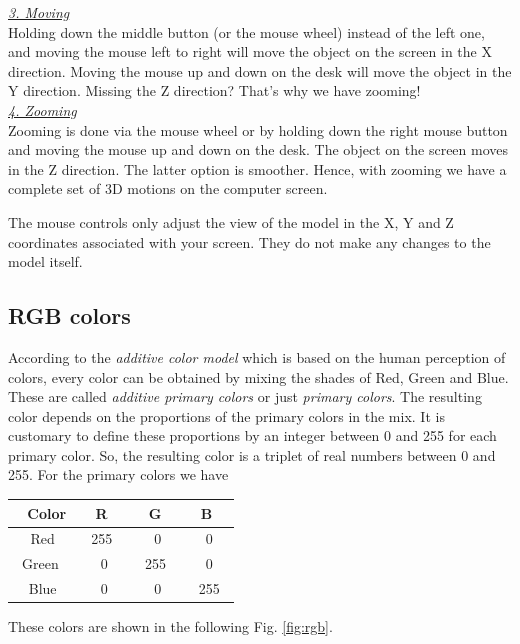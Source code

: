 \noindent
\underline{\em 3. Moving}\\

\noindent
Holding down the middle button (or the mouse wheel) instead of the 
left one, and moving the mouse left to right will move the object on the 
screen in the X direction. Moving the mouse up and down on the desk will 
move the object in the Y direction. Missing the Z direction? That's why 
we have zooming!\\

\noindent
\underline{\em 4. Zooming}\\

\noindent
Zooming is done via the mouse wheel or by holding down the right
mouse button and moving the mouse up and down on the desk. The object 
on the screen moves in the Z direction. The latter option is smoother.
Hence, with zooming we have a complete set of 3D motions on the 
computer screen.\\

\begin{gbox}
\begin{center}
The mouse controls only adjust the view of the model in the X, Y and Z coordinates 
associated with your screen. They do not 
make any changes to the model itself.
\end{center}
\end{gbox}


\subsection{RGB colors}

According to the {\em additive color model} which is based on the human perception of colors,
every color can be obtained by mixing the shades of Red, Green and Blue. These are 
called {\em additive primary colors} or just {\em primary colors}. The resulting color depends on the proportions of the 
primary colors in the mix. It is customary to define these proportions by an integer 
between 0 and 255 for each primary color. So, the resulting color is a triplet of 
real numbers between 0 and 255. For the primary colors we have\\

\begin{center}
\begin{tabular}{|c||c|c|c|}
\hline
\ Color & \ R \ & \ G \ & \ B \ \\
\hline
\hline
Red & \ 255 \ & 0 & 0\\
\hline
\ Green \ & 0 & \ 255 \ & 0\\
\hline
Blue & 0 & 0 & \ 255\ \\
\hline
\end{tabular}
\end{center}
\vspace{4mm}
These colors are shown in the following Fig. \ref{fig:rgb}.
\newpage

